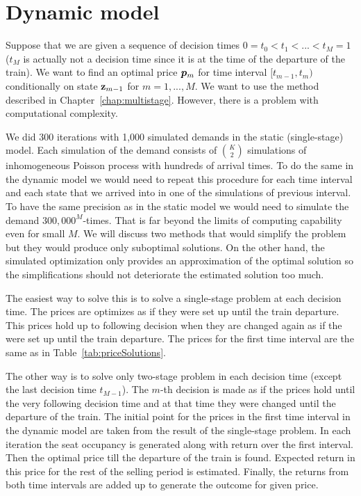 \section{Dynamic model}
	\label{chap:dynamicModel}

Suppose that we are given a sequence of decision times $0 = t_0 < t_1 < ... < t_M = 1$ ($t_M$ is actually not a decision time since it is at the time of the departure of the train). We want to find an optimal price $\bm{p}_m$ for time interval $[t_{m-1} , t_{m})$ conditionally on state $\operatorname{\mathbf{z}}_{m-1}$ for $m = 1, ..., M$. We want to use the method described in Chapter~\ref{chap:multistage}. However, there is a problem with computational complexity.

We did 300 iterations with 1,000 simulated demands in the static (single-stage) model. Each simulation of the demand consists of $\binom{K}{2}$ simulations of inhomogeneous Poisson process with hundreds of arrival times. To do the same in the dynamic model we would need to repeat this procedure for each time interval and each state that we arrived into in one of the simulations of previous interval. To have the same precision as in the static model we would need to simulate the demand $300,000^M$-times. That is far beyond the limits of computing capability even for small $M$. We will discuss two methods that would simplify the problem but they would produce only suboptimal solutions. On the other hand, the simulated optimization only provides an approximation of the optimal solution so the simplifications should not deteriorate the estimated solution too much.

The easiest way to solve this is to solve a single-stage problem at each decision time. The prices are optimizes as if they were set up until the train departure. This prices hold up to following decision when they are changed again as if the were set up until the train departure. The prices for the first time interval are the same as in Table~\ref{tab:priceSolutions}.

The other way is to solve only two-stage problem in each decision time (except the last decision time $t_{M-1}$). The $m$-th decision is made as if the prices hold until the very following decision time and at that time they were changed until the departure of the train. The initial point for the prices in the first time interval in the dynamic model are taken from the result of the single-stage problem. In each iteration the seat occupancy is generated along with return over the first interval. Then the optimal price till the departure of the train is found. Expected return in this price for the rest of the selling period is estimated. Finally, the returns from both time intervals are added up to generate the outcome for given price.

